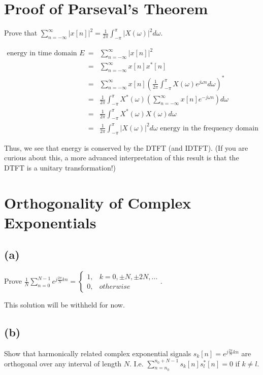 \documentclass[11pt]{article}
\begin{document}
\section{Proof of Parseval's Theorem}
Prove that $\sum_{n=-\infty}^\infty|x[n]|^2 = \frac{1}{2 \pi} \int_{- \pi}^\pi |X(\omega)|^2 d\omega$.

{\color{blue}
\begin{eqnarray*}
\text{energy in time domain } E &=& \sum\limits_{n=-\infty}^\infty |x[n]|^2 \\
&=& \sum\limits_{n=-\infty}^\infty x[n]x^*[n] \\
&=& \sum\limits_{n=-\infty}^\infty x[n]\left(\frac{1}{2 \pi} \int_{-\pi}^\pi X(\omega)e^{j\omega n} d\omega \right)^* \\
&=& \frac{1}{2 \pi} \int_{-\pi}^\pi X^*(\omega) \left( \sum\limits_{n=-\infty}^\infty x[n]e^{-j\omega n}  \right)d\omega \\
&=& \frac{1}{2 \pi} \int_{-\pi}^\pi X^*(\omega) X(\omega) d\omega \\
&=& \frac{1}{2 \pi} \int_{-\pi}^\pi |X(\omega)|^2 d\omega  \text{ energy in the frequency domain}
\end{eqnarray*}

Thus, we see that energy is conserved by the DTFT (and IDTFT). (If you are curious about this, a more advanced interpretation of this result is that the DTFT is a unitary transformation!)
}

\section{Orthogonality of Complex Exponentials}

\subsection*{(a)}
Prove $\frac{1}{N}\sum\limits_{n=0}^{N-1} e^{j\frac{2 \pi}{N} k n} = \begin{cases}1, & k =0, \pm N, \pm 2N,... \\0, & otherwise \end{cases}$.

{\color{blue}
This solution will be withheld for now.
}

\subsection*{(b)} 
Show that harmonically related complex exponential signals $s_k[n]=e^{j\frac{2 \pi}{N} kn}$ are orthogonal over any interval of length $N$. I.e. $\sum\limits_{n=n_0}^{n_0+N-1} s_k[n]s_l^*[n] = 0$ if $k \neq l$.
\end{document}
